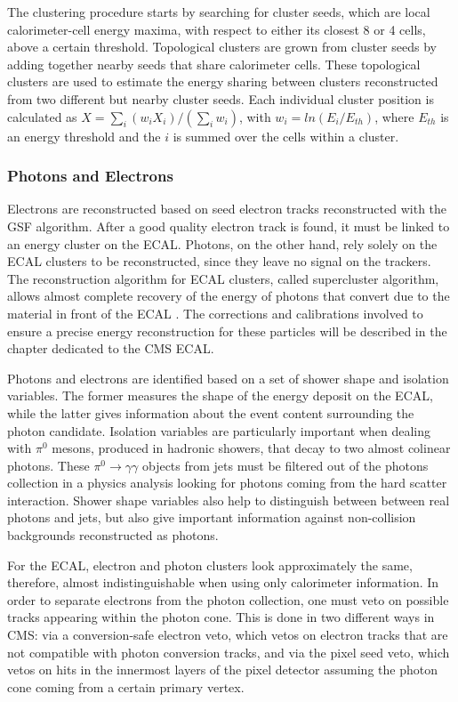 The clustering procedure starts by searching for cluster seeds, which are local calorimeter-cell energy maxima, with respect to either its closest 8 or 4 cells, above a certain threshold. 
Topological clusters are grown from cluster seeds by adding together nearby seeds that share calorimeter cells. 
These topological clusters are used to estimate the energy sharing between clusters reconstructed from two different but nearby cluster seeds. 
Each individual cluster position is calculated as $X=\sum_{i}(w_{i}X_{i})/(\sum_{i}w_{i})$, with $w_{i}=ln(E_{i}/E_{th})$, where $E_{th}$ is an energy threshold and the $i$ is summed over the cells within a cluster.

\subsubsection{Photons and Electrons}

Electrons are reconstructed based on seed electron tracks reconstructed with the GSF algorithm. 
After a good quality electron track is found, it must be linked to an energy cluster on the ECAL. 
Photons, on the other hand, rely solely on the ECAL clusters to be reconstructed, since they leave no signal on the trackers. 
The reconstruction algorithm for ECAL clusters, called supercluster algorithm, allows almost complete recovery of the energy of photons that convert due to the material in front of the ECAL \cite{cms_egamma}. 
The corrections and calibrations involved to ensure a precise energy reconstruction for these particles will be described in the chapter dedicated to the CMS ECAL. 

Photons and electrons are identified based on a set of shower shape and isolation variables. 
The former measures the shape of the energy deposit on the ECAL, while the latter gives information about the event content surrounding the photon candidate. 
Isolation variables are particularly important when dealing with $\pi^{0}$ mesons, produced in hadronic showers, that decay to two almost colinear photons. 
These $\pi^{0}\rightarrow\gamma\gamma$ objects from jets must be filtered out of the photons collection in a physics analysis looking for photons coming from the hard scatter interaction. 
Shower shape variables also help to distinguish between between real photons and jets, but also give important information against non-collision backgrounds reconstructed as photons. 

For the ECAL, electron and photon clusters look approximately the same, therefore, almost indistinguishable when using only calorimeter information. 
In order to separate electrons from the photon collection, one must veto on possible tracks appearing within the photon cone. 
This is done in two different ways in CMS: via a conversion-safe electron veto, which vetos on electron tracks that are not compatible with photon conversion tracks, and via the pixel seed veto, which vetos on hits in the innermost layers of the pixel detector assuming the photon cone coming from a certain primary vertex.

